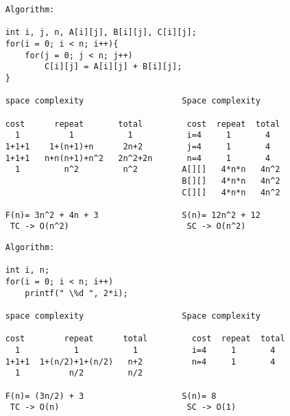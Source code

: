 \documentclass{article}
\begin{document}
\newpage
\hrulefill
    \begin{verbatim}
    Algorithm:

    int i, j, n, A[i][j], B[i][j], C[i][j];
    for(i = 0; i < n; i++){
        for(j = 0; j < n; j++)
            C[i][j] = A[i][j] + B[i][j];
    }
    
    space complexity                    Space complexity

    cost      repeat       total         cost  repeat  total
      1          1           1           i=4     1       4
    1+1+1    1+(n+1)+n      2n+2         j=4     1       4
    1+1+1   n+n(n+1)+n^2   2n^2+2n       n=4     1       4
      1         n^2         n^2         A[][]   4*n*n   4n^2
                                        B[][]   4*n*n   4n^2
                                        C[][]   4*n*n   4n^2

    F(n)= 3n^2 + 4n + 3                 S(n)= 12n^2 + 12
     TC -> O(n^2)                        SC -> O(n^2)
\end{verbatim}

\hrulefill
\begin{verbatim}
    Algorithm:

    int i, n;
    for(i = 0; i < n; i++)
        printf(" \%d ", 2*i);
    
    space complexity                    Space complexity

    cost        repeat      total         cost  repeat  total
      1           1           1           i=4     1       4
    1+1+1  1+(n/2)+1+(n/2)   n+2          n=4     1       4
      1          n/2         n/2         

    F(n)= (3n/2) + 3                    S(n)= 8
     TC -> O(n)                          SC -> O(1)
\end{verbatim}
\end{document}
